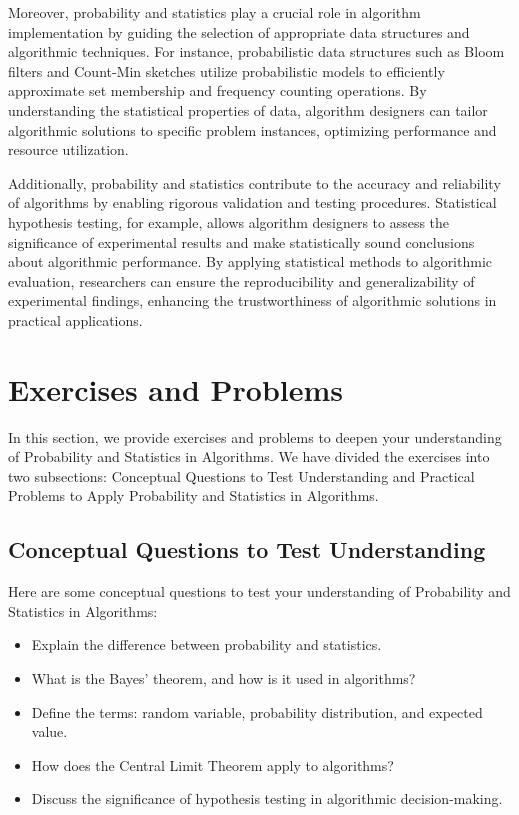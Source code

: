 \documentclass[12pt]{book} %
\begin{document}
Moreover, probability and statistics play a crucial role in algorithm implementation by guiding the selection of appropriate data structures and algorithmic techniques. For instance, probabilistic data structures such as Bloom filters and Count-Min sketches utilize probabilistic models to efficiently approximate set membership and frequency counting operations. By understanding the statistical properties of data, algorithm designers can tailor algorithmic solutions to specific problem instances, optimizing performance and resource utilization.

Additionally, probability and statistics contribute to the accuracy and reliability of algorithms by enabling rigorous validation and testing procedures. Statistical hypothesis testing, for example, allows algorithm designers to assess the significance of experimental results and make statistically sound conclusions about algorithmic performance. By applying statistical methods to algorithmic evaluation, researchers can ensure the reproducibility and generalizability of experimental findings, enhancing the trustworthiness of algorithmic solutions in practical applications.

\section{Exercises and Problems}
In this section, we provide exercises and problems to deepen your understanding of Probability and Statistics in Algorithms. We have divided the exercises into two subsections: Conceptual Questions to Test Understanding and Practical Problems to Apply Probability and Statistics in Algorithms.

\subsection{Conceptual Questions to Test Understanding}
Here are some conceptual questions to test your understanding of Probability and Statistics in Algorithms:

\begin{itemize}
    \item Explain the difference between probability and statistics.
    \item What is the Bayes' theorem, and how is it used in algorithms?
    \item Define the terms: random variable, probability distribution, and expected value.
    \item How does the Central Limit Theorem apply to algorithms?
    \item Discuss the significance of hypothesis testing in algorithmic decision-making.
\end{itemize}
\end{document}
